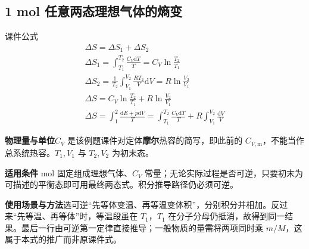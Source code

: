 \documentclass[UTF8,fontset=none,zihao=-4,a4paper]{ctexart}
\newcommand{\explain}[3]{\par\noindent\textbf{物理量与单位}\quad #1\par
\noindent\textbf{适用条件}\quad #2\par
\noindent\textbf{使用场景与方法}\quad #3\par}
\begin{document}
\par\noindent\begin{minipage}{\linewidth}
\subsection{1 mol 任意两态理想气体的熵变}
\begin{infobox}[breakable=false]{课件公式}
\begin{gather*}\Delta S=\Delta S_1+\Delta S_2\\\Delta S_1=\int_{T_1}^{T_2}\frac{C_V\mathrm dT}T=C_V\ln\frac{T_2}{T_1}\\\Delta S_2=\frac1{T_2}\int_{V_1}^{V_2}\frac{RT_2}V\mathrm dV=R\ln\frac{V_2}{V_1}\\\Delta S=C_V\ln\frac{T_2}{T_1}+R\ln\frac{V_2}{V_1}\\\Delta S=\int_1^2\frac{\mathrm dE+p\mathrm dV}T=\int_{T_1}^{T_2}\frac{C_V\mathrm dT}T+R\int_{V_1}^{V_2}\frac{\mathrm dV}V\end{gather*}
\end{infobox}
\end{minipage}\par
\explain{$C_V$ 是该例题课件对定体\textbf{摩尔}热容的简写，即此前的 $C_{V,\mathrm m}$，不能当作总系统热容。$T_1,V_1$ 与 $T_2,V_2$ 为初末态。}{1 mol 固定组成理想气体、$C_V$ 常量；无论实际过程是否可逆，只要初末为可描述的平衡态即可用最终两态式。积分推导路径仍必须可逆。}{选可逆“先等体变温、再等温变体积”，分别积分并相加。反过来“先等温、再等体”时，等温段虽在 $T_1$，$T_1$ 在分子分母仍抵消，故得到同一结果。最后一行由可逆第一定律直接推导；一般物质的量需将两项同时乘 $m/M$，这属于本式的推广而非原课件式。}
\end{document}
